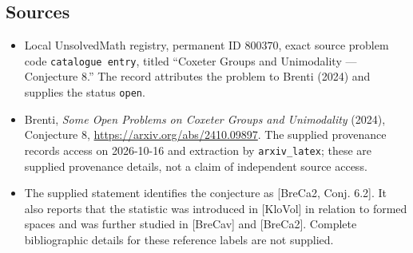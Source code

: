 \documentclass[11pt]{article}
\begin{document}
\subsection{Sources}
\begin{itemize}
\item Local UnsolvedMath registry, permanent ID \(800370\), exact source problem code \texttt{catalogue entry}, titled ``Coxeter Groups and Unimodality --- Conjecture 8.'' The record attributes the problem to Brenti (2024) and supplies the status \texttt{open}.
\item Brenti, \emph{Some Open Problems on Coxeter Groups and Unimodality} (2024), Conjecture 8, \url{https://arxiv.org/abs/2410.09897}. The supplied provenance records access on 2026-10-16 and extraction by \texttt{arxiv\_latex}; these are supplied provenance details, not a claim of independent source access.
\item The supplied statement identifies the conjecture as [BreCa2, Conj. 6.2]. It also reports that the statistic was introduced in [KloVol] in relation to formed spaces and was further studied in [BreCav] and [BreCa2]. Complete bibliographic details for these reference labels are not supplied.
\end{itemize}
\end{document}
